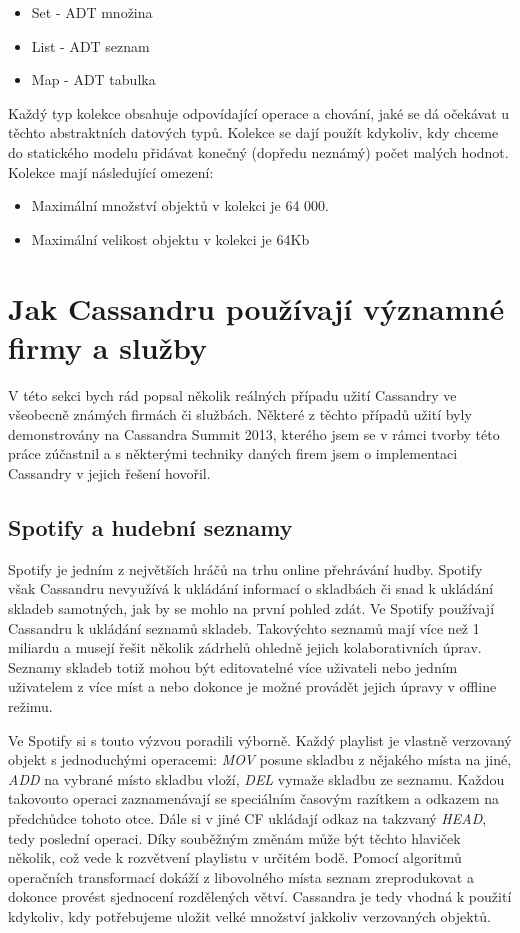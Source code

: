 \begin{itemize}
\item Set - ADT množina
\item List - ADT seznam
\item Map - ADT tabulka
\end{itemize}

Každý typ kolekce obsahuje odpovídající operace a chování, jaké se dá očekávat u těchto abstraktních datových typů. Kolekce se dají použít kdykoliv, kdy chceme do statického modelu přidávat konečný (dopředu neznámý) počet malých hodnot. Kolekce mají následující omezení: 

\begin{itemize}
\item Maximální množství objektů v kolekci je 64 000.
\item Maximální velikost objektu v kolekci je 64Kb
\end{itemize}

\section{Jak Cassandru používají významné firmy a služby}

V této sekci bych rád popsal několik reálných případu užití Cassandry ve všeobecně známých firmách či službách. Některé z těchto případů užití byly demonstrovány na Cassandra Summit 2013, kterého jsem se v rámci tvorby této práce zúčastnil a s některými techniky daných firem jsem o implementaci Cassandry v jejich řešení hovořil. 

\subsection{Spotify a hudební seznamy}
Spotify je jedním z největších hráčů na trhu online přehrávání hudby. Spotify však Cassandru nevyužívá k ukládání informací o skladbách či snad k ukládání skladeb samotných, jak by se mohlo na první pohled zdát. Ve Spotify používají Cassandru k ukládání seznamů skladeb. Takovýchto seznamů mají více než 1 miliardu a musejí řešit několik zádrhelů ohledně jejich kolaborativních úprav. Seznamy skladeb totiž mohou být editovatelné více uživateli nebo jedním uživatelem z více míst a nebo dokonce je možné provádět jejich úpravy v offline režimu. 

Ve Spotify si s touto výzvou poradili výborně. Každý playlist je vlastně verzovaný objekt s jednoduchými operacemi: \emph{MOV} posune skladbu z nějakého místa na jiné, \emph{ADD} na vybrané místo skladbu vloží, \emph{DEL} vymaže skladbu ze seznamu. Každou takovouto operaci zaznamenávají se speciálním časovým razítkem a odkazem na předchůdce tohoto otce. Dále si v jiné CF ukládají odkaz na takzvaný \emph{HEAD}, tedy poslední operaci. Díky souběžným změnám může být těchto hlaviček několik, což vede k rozvětvení playlistu v určitém bodě. Pomocí algoritmů operačních transformací dokáží z libovolného místa seznam zreprodukovat a dokonce provést sjednocení rozdělených větví. Cassandra je tedy vhodná k použití kdykoliv, kdy potřebujeme uložit velké množství jakkoliv verzovaných objektů. 

